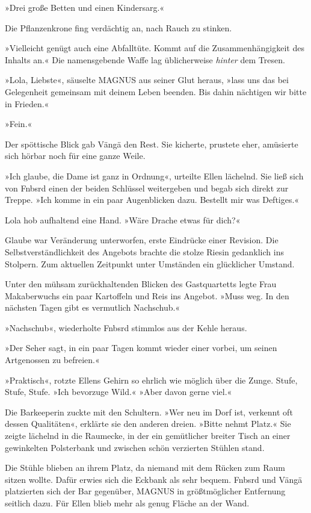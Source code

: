 »Drei große Betten und einen Kindersarg.«

Die Pflanzenkrone fing verdächtig an, nach Rauch zu stinken.

»Vielleicht genügt auch eine Abfalltüte. Kommt auf die Zusammenhängigkeit des Inhalts an.« Die namensgebende Waffe lag üblicherweise \emph{hinter} dem Tresen.

»Lola, Liebste«, säuselte MAGNUS aus seiner Glut heraus, »lass uns das bei Gelegenheit gemeinsam mit deinem Leben beenden. Bis dahin nächtigen wir bitte in Frieden.«

»Fein.«

Der spöttische Blick gab Vängä den Rest. Sie kicherte, prustete eher, amüsierte sich hörbar noch für eine ganze Weile.

»Ich glaube, die Dame ist ganz in Ordnung«, urteilte Ellen lächelnd. Sie ließ sich von Fnbsrd einen der beiden Schlüssel weitergeben und begab sich direkt zur Treppe. »Ich komme in ein paar Augenblicken dazu. Bestellt mir was Deftiges.«

Lola hob aufhaltend eine Hand. »Wäre Drache etwas für dich?«

Glaube war Veränderung unterworfen, erste Eindrücke einer Revision. Die Selbstverständlichkeit des Angebots brachte die stolze Riesin gedanklich ins Stolpern. Zum aktuellen Zeitpunkt unter Umständen ein glücklicher Umstand.

Unter den mühsam zurückhaltenden Blicken des Gastquartetts legte Frau Makaberwuchs ein paar Kartoffeln und Reis ins Angebot. »Muss weg. In den nächsten Tagen gibt es vermutlich Nachschub.«

»Nachschub«, wiederholte Fnbsrd stimmlos aus der Kehle heraus.

»Der Seher sagt, in ein paar Tagen kommt wieder einer vorbei, um seinen Artgenossen zu befreien.«

»Praktisch«, rotzte Ellens Gehirn so ehrlich wie möglich über die Zunge. Stufe, Stufe, Stufe. »Ich bevorzuge Wild.«  »Aber davon gerne viel.«

Die Barkeeperin zuckte mit den Schultern. »Wer neu im Dorf ist, verkennt oft dessen Qualitäten«, erklärte sie den anderen dreien. »Bitte nehmt Platz.« Sie zeigte lächelnd in die Raumecke, in der ein gemütlicher breiter Tisch an einer gewinkelten Polsterbank und zwischen schön verzierten Stühlen stand.

Die Stühle blieben an ihrem Platz, da niemand mit dem Rücken zum Raum sitzen wollte. Dafür erwies sich die Eckbank als sehr bequem. Fnbsrd und Vängä platzierten sich der Bar gegenüber, MAGNUS in größtmöglicher Entfernung seitlich dazu. Für Ellen blieb mehr als genug Fläche an der Wand.

